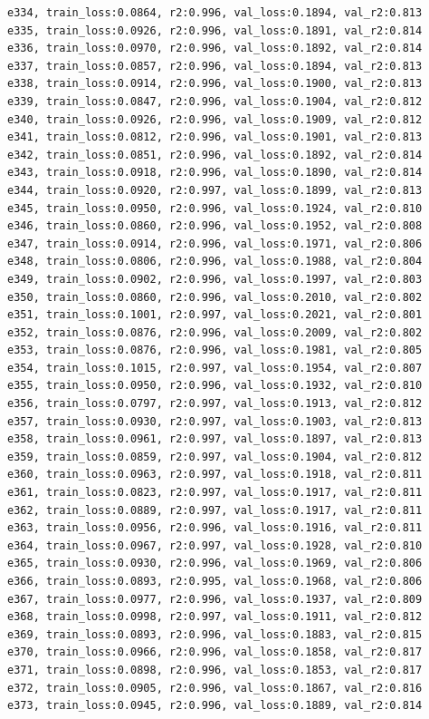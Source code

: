 \documentclass[a4paper, 12pt]{article}
\begin{document}
\begin{lstlisting}
e334, train_loss:0.0864, r2:0.996, val_loss:0.1894, val_r2:0.813
e335, train_loss:0.0926, r2:0.996, val_loss:0.1891, val_r2:0.814
e336, train_loss:0.0970, r2:0.996, val_loss:0.1892, val_r2:0.814
e337, train_loss:0.0857, r2:0.996, val_loss:0.1894, val_r2:0.813
e338, train_loss:0.0914, r2:0.996, val_loss:0.1900, val_r2:0.813
e339, train_loss:0.0847, r2:0.996, val_loss:0.1904, val_r2:0.812
e340, train_loss:0.0926, r2:0.996, val_loss:0.1909, val_r2:0.812
e341, train_loss:0.0812, r2:0.996, val_loss:0.1901, val_r2:0.813
e342, train_loss:0.0851, r2:0.996, val_loss:0.1892, val_r2:0.814
e343, train_loss:0.0918, r2:0.996, val_loss:0.1890, val_r2:0.814
e344, train_loss:0.0920, r2:0.997, val_loss:0.1899, val_r2:0.813
e345, train_loss:0.0950, r2:0.996, val_loss:0.1924, val_r2:0.810
e346, train_loss:0.0860, r2:0.996, val_loss:0.1952, val_r2:0.808
e347, train_loss:0.0914, r2:0.996, val_loss:0.1971, val_r2:0.806
e348, train_loss:0.0806, r2:0.996, val_loss:0.1988, val_r2:0.804
e349, train_loss:0.0902, r2:0.996, val_loss:0.1997, val_r2:0.803
e350, train_loss:0.0860, r2:0.996, val_loss:0.2010, val_r2:0.802
e351, train_loss:0.1001, r2:0.997, val_loss:0.2021, val_r2:0.801
e352, train_loss:0.0876, r2:0.996, val_loss:0.2009, val_r2:0.802
e353, train_loss:0.0876, r2:0.996, val_loss:0.1981, val_r2:0.805
e354, train_loss:0.1015, r2:0.997, val_loss:0.1954, val_r2:0.807
e355, train_loss:0.0950, r2:0.996, val_loss:0.1932, val_r2:0.810
e356, train_loss:0.0797, r2:0.997, val_loss:0.1913, val_r2:0.812
e357, train_loss:0.0930, r2:0.997, val_loss:0.1903, val_r2:0.813
e358, train_loss:0.0961, r2:0.997, val_loss:0.1897, val_r2:0.813
e359, train_loss:0.0859, r2:0.997, val_loss:0.1904, val_r2:0.812
e360, train_loss:0.0963, r2:0.997, val_loss:0.1918, val_r2:0.811
e361, train_loss:0.0823, r2:0.997, val_loss:0.1917, val_r2:0.811
e362, train_loss:0.0889, r2:0.997, val_loss:0.1917, val_r2:0.811
e363, train_loss:0.0956, r2:0.996, val_loss:0.1916, val_r2:0.811
e364, train_loss:0.0967, r2:0.997, val_loss:0.1928, val_r2:0.810
e365, train_loss:0.0930, r2:0.996, val_loss:0.1969, val_r2:0.806
e366, train_loss:0.0893, r2:0.995, val_loss:0.1968, val_r2:0.806
e367, train_loss:0.0977, r2:0.996, val_loss:0.1937, val_r2:0.809
e368, train_loss:0.0998, r2:0.997, val_loss:0.1911, val_r2:0.812
e369, train_loss:0.0893, r2:0.996, val_loss:0.1883, val_r2:0.815
e370, train_loss:0.0966, r2:0.996, val_loss:0.1858, val_r2:0.817
e371, train_loss:0.0898, r2:0.996, val_loss:0.1853, val_r2:0.817
e372, train_loss:0.0905, r2:0.996, val_loss:0.1867, val_r2:0.816
e373, train_loss:0.0945, r2:0.996, val_loss:0.1889, val_r2:0.814

\end{lstlisting}
\end{document}
